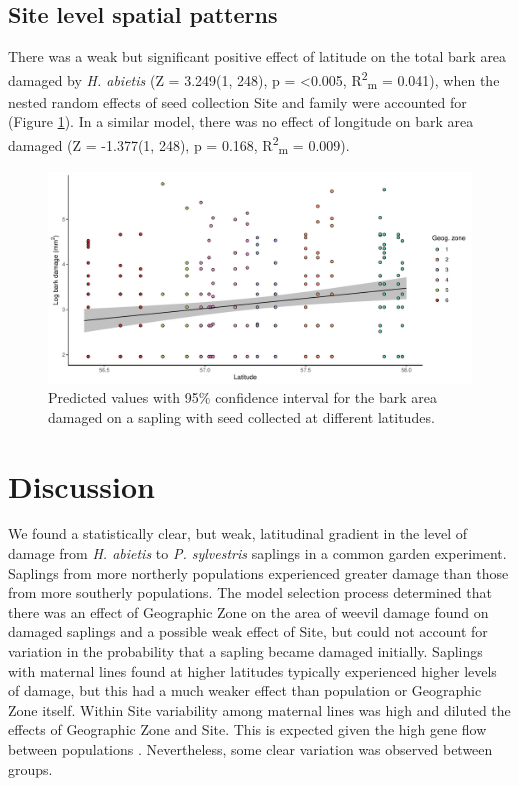 \documentclass[a4paper, 11pt]{article}
\begin{document}


\subsection*{Site level spatial patterns}

There was a weak but significant positive effect of latitude on the total bark area damaged by \textit{H. abietis} (Z = 3.249(1, 248), p =  \textless{}0.005, R\textsuperscript{2}\textsubscript{m} = 0.041), when the nested random effects of seed collection Site and family were accounted for (Figure \ref{pred_lat}). In a similar model, there was no effect of longitude on bark area damaged (Z = -1.377(1, 248), p = 0.168, R\textsuperscript{2}\textsubscript{m} = 0.009).  

\begin{figure}[H]
	\includegraphics[width=\textwidth]{pred_lat}
	\caption{Predicted values with 95\% confidence interval for the bark area damaged on a sapling with seed  collected at different latitudes.}
	\label{pred_lat}
\end{figure}

\section*{Discussion}

We found a statistically clear, but weak, latitudinal gradient in the level of damage from \textit{H. abietis} to \textit{P. sylvestris} saplings in a common garden experiment. Saplings from more northerly populations experienced greater damage than those from more southerly populations. The model selection process determined that there was an effect of Geographic Zone on the area of weevil damage found on damaged saplings and a possible weak effect of Site, but could not account for variation in the probability that a sapling became damaged initially. Saplings with maternal lines found at higher latitudes typically experienced higher levels of damage, but this had a much weaker effect than population or Geographic Zone itself. Within Site variability among maternal lines was high and diluted the effects of Geographic Zone and Site. This is expected given the high gene flow between populations \citep{Donnelly2018}. Nevertheless, some clear variation was observed between groups.
\end{document}
